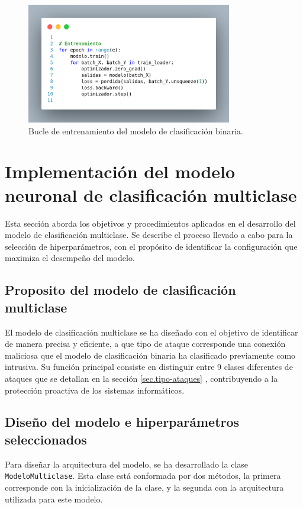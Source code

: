 \begin{figure}[H]
    \centering
    \includegraphics[width=0.8\textwidth]{./img/modelo/codigo/EntrenamientoCVBIN.png}
    \caption{Bucle de entrenamiento del modelo de clasificación binaria.}
    \label{fig:EntrenamientoCVBIN}
\end{figure}



\section{Implementación del modelo neuronal de clasificación multiclase}
Esta sección aborda los objetivos y procedimientos aplicados en el desarrollo del modelo de clasificación multiclase. Se describe el proceso llevado a cabo para la selección de hiperparámetros, con el propósito de identificar la configuración que maximiza el desempeño del modelo.

\subsection{Proposito del modelo de clasificación multiclase}

El modelo de clasificación multiclase se ha diseñado con el objetivo de identificar de manera precisa y eficiente, a que tipo de ataque corresponde una conexión maliciosa que el modelo de clasificación binaria ha clasificado previamente como intrusiva. Su función principal consiste en distinguir entre 9 clases diferentes de ataques que se detallan en la sección \ref{sec.tipo-ataques} , contribuyendo a la protección proactiva de los sistemas informáticos.

\subsection{Diseño del modelo e hiperparámetros seleccionados} \label{sec:disMUL}
Para diseñar la arquitectura del modelo, se ha desarrollado la clase \texttt{ModeloMulticlase}. Esta clase está conformada por dos métodos, la primera corresponde con la inicialización de la clase, y la segunda con la arquitectura utilizada para este modelo.

